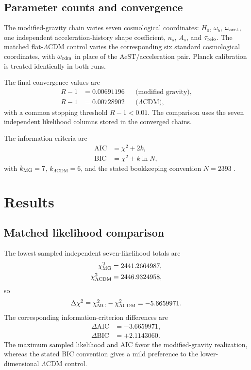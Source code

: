 \documentclass[aps,prd,twocolumn,superscriptaddress,nofootinbib,longbibliography,floatfix]{revtex4-2}
\newcommand{\LCDM}{\Lambda\mathrm{CDM}}
\begin{document}
\subsection{Parameter counts and convergence}
The modified-gravity chain varies seven cosmological coordinates: $H_0$, $\omega_b$, $\omega_{\rm aest}$, one independent acceleration-history shape coefficient, $n_s$, $A_s$, and $\tau_{\rm reio}$. The matched flat-$\LCDM$ control varies the corresponding six standard cosmological coordinates, with $\omega_{\rm cdm}$ in place of the AeST/acceleration pair. Planck calibration is treated identically in both runs.

The final convergence values are
\begin{align}
R-1&=0.00691196 &&\text{(modified gravity)},\\
R-1&=0.00728902 &&\text{($\LCDM$)},
\end{align}
with a common stopping threshold $R-1<0.01$. The comparison uses the seven independent likelihood columns stored in the converged chains.

The information criteria are
\begin{align}
\mathrm{AIC}&=\chi^2+2k,\label{eq:aic}\\
\mathrm{BIC}&=\chi^2+k\ln N,\label{eq:bic}
\end{align}
with $k_{\rm MG}=7$, $k_{\LCDM}=6$, and the stated bookkeeping convention $N=2393$ \cite{Akaike1974,Schwarz1978,Liddle2007}.

\section{Results}\label{sec:results}
\subsection{Matched likelihood comparison}
The lowest sampled independent seven-likelihood totals are
\begin{align}
\chi^2_{\rm MG}&=2441.2664987,\\
\chi^2_{\LCDM}&=2446.9324958,
\end{align}
so
\begin{equation}
\Delta\chi^2\equiv\chi^2_{\rm MG}-\chi^2_{\LCDM}=-5.6659971.
\end{equation}
The corresponding information-criterion differences are
\begin{align}
\Delta\mathrm{AIC}&=-3.6659971,\\
\Delta\mathrm{BIC}&=+2.1143060.
\end{align}
The maximum sampled likelihood and AIC favor the modified-gravity realization, whereas the stated BIC convention gives a mild preference to the lower-dimensional $\LCDM$ control.
\end{document}

